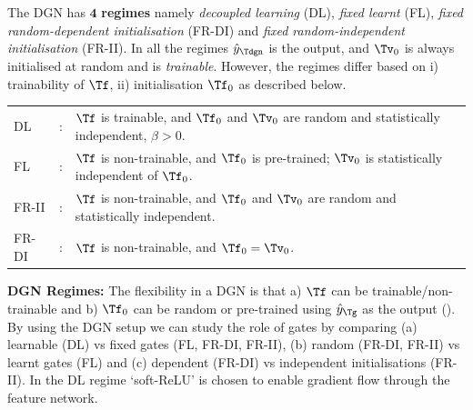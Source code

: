 \begin{definition}\label{rm:regime}The DGN has $\mathbf{4}$ \textbf{regimes} namely \emph{decoupled learning} (DL), \emph{fixed learnt} (FL), \emph{fixed random-dependent initialisation} (FR-DI) and \emph{fixed random-independent initialisation} (FR-II). 
In all the regimes $\hat{y}_{\Tdgn}$ is the output, and $\Tv_0$ is always initialised at random and is \emph{trainable}. However, the regimes differ based on i) trainability of $\Tf$, ii) initialisation $\Tf_0$ as described below.\\
\begin{tabular}{lll}
DL              &: & $\Tf$ is trainable, and $\Tf_0$ and $\Tv_0$ are random and statistically independent,  $\beta>0$.\\
FL              &: & $\Tf$ is non-trainable, and $\Tf_0$ is pre-trained;  $\Tv_0$ is statistically independent of $\Tf_0$. \\
FR-II           &: & $\Tf$ is non-trainable, and $\Tf_0$ and $\Tv_0$ are random and statistically independent.\\
FR-DI   &:&  $\Tf$ is non-trainable, and $\Tf_0=\Tv_0$.\\
\end{tabular}
\end{definition}
\textbf{DGN Regimes:} The flexibility in a DGN is that  a) $\Tf$ can be trainable/non-trainable and b) $\Tf_0$ can be random or pre-trained using $\hat{y}_{\Tg}$ as the output (). By using the DGN setup we can study the role of gates by comparing (a) learnable (DL) vs fixed gates (FL, FR-DI, FR-II), (b) random (FR-DI, FR-II) vs learnt gates (FL) and (c) dependent (FR-DI) vs independent initialisations (FR-II). In the DL regime `soft-ReLU' is chosen to enable gradient flow through the feature network.

